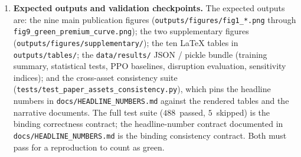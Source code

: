 \documentclass[review,preprint,authoryear,12pt]{elsarticle}
\begin{document}
\begin{enumerate}
\item \textbf{Expected outputs and validation checkpoints.} The
expected outputs are: the nine main publication figures
(\texttt{outputs/figures/fig1\_*.png} through
\texttt{fig9\_green\_premium\_curve.png}); the two supplementary
figures (\texttt{outputs/figures/supplementary/}); the ten LaTeX
tables in \texttt{outputs/tables/}; the \texttt{data/results/}
JSON / pickle bundle (training summary, statistical tests, PPO
baselines, disruption evaluation, sensitivity indices); and the
cross-asset consistency suite
(\texttt{tests/test\_paper\_assets\_consistency.py}), which pins
the headline numbers in \texttt{docs/HEADLINE\_NUMBERS.md} against
the rendered tables and the narrative documents. The full test
suite ($488$~passed, $5$~skipped) is the binding correctness
contract; the headline-number contract documented in
\texttt{docs/HEADLINE\_NUMBERS.md} is the binding consistency
contract. Both must pass for a reproduction to count as green.
\end{enumerate}



\end{document}
